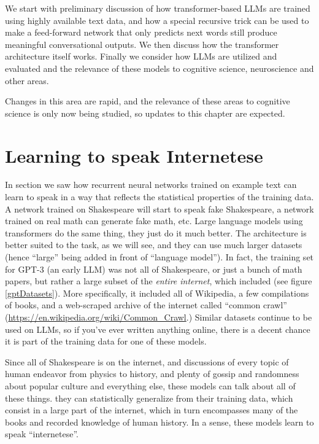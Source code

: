 We start with preliminary discussion of how transformer-based LLMs are trained using highly available text data, and how a special recursive trick can be used to make a feed-forward network that only predicts next words still produce meaningful conversational outputs. We then discuss how the transformer architecture itself works.  Finally we consider how LLMs are utilized and evaluated and the relevance of these models to cognitive science, neuroscience and other areas.

Changes in this area are rapid, and the relevance of these areas to cognitive science is only now being studied, so updates to this chapter are expected.

\section{Learning to speak Internetese}

In section  we saw how recurrent neural networks trained on example text can learn to speak in a way that reflects the statistical properties of the training data. A network trained on Shakespeare will start to speak fake Shakespeare, a network trained on real math can generate fake math, etc.  Large language models using transformers do the same thing, they just do it much better. The architecture is better suited to the task, as we will see, and they can use much larger datasets (hence ``large'' being added in front of ``language model''). In fact, the training set for GPT-3 (an early LLM) was not all of Shakespeare, or just a bunch of math papers, but rather a large subset of the \emph{entire internet}, which included  (see figure \ref{gptDatasets}).  More specifically, it included all of Wikipedia, a few compilations of books, and a web-scraped archive of the internet called ``common crawl'' (\url{https://en.wikipedia.org/wiki/Common_Crawl}.) Similar datasets continue to be used on LLMs, so if you've ever written anything online, there is a decent chance it is part of the training data for one of these models. 

Since all of Shakespeare is on the internet, and discussions of every topic of human endeavor from physics to history, and plenty of gossip and randomness about popular culture and everything else, these models can talk about all of these things.  they can statistically generalize from their training data, which consist in a large part of the internet, which in turn encompasses many of the books and recorded knowledge of human history. In a sense, these models learn to speak ``internetese''.  

